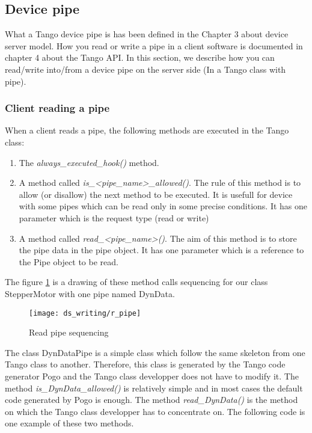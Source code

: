 \subsection{Device pipe}

What a Tango device pipe is has been defined in the Chapter 3 about
device server model. How you read or write a pipe in a client software
is documented in chapter 4 about the Tango API. In this section, we
describe how you can read/write into/from a device pipe on the server
side (In a Tango class with pipe).


\subsubsection{Client reading a pipe}

When a client reads a pipe, the following methods are executed in
the Tango class:
\begin{enumerate}
\item The \emph{always\_executed\_hook()} method.
\item A method called \emph{is\_<pipe\_name>\_allowed()}. The rule of this
method is to allow (or disallow) the next method to be executed. It
is usefull for device with some pipes which can be read only in some
precise conditions. It has one parameter which is the request type
(read or write)
\item A method called \emph{read\_<pipe\_name>()}. The aim of this method
is to store the pipe data in the pipe object. It has one parameter
which is a reference to the Pipe object to be read.
\end{enumerate}
The figure \ref{r_pipe_timing_fig-1} is a drawing of these method
calls sequencing for our class StepperMotor with one pipe named DynData.
\begin{figure}[H]
\begin{centering}
\texttt{[image: ds\_writing/r\_pipe]}
\par\end{centering}

\protect\caption{Read pipe sequencing}
\label{r_pipe_timing_fig-1}
\end{figure}


The class DynDataPipe is a simple class which follow the same skeleton
from one Tango class to another. Therefore, this class is generated
by the Tango code generator Pogo and the Tango class developper does
not have to modify it. The method \emph{is\_DynData\_allowed()} is
relatively simple and in most cases the default code generated by
Pogo is enough. The method \emph{read\_DynData()} is the method on
which the Tango class developper has to concentrate on. The following
code is one example of these two methods.


